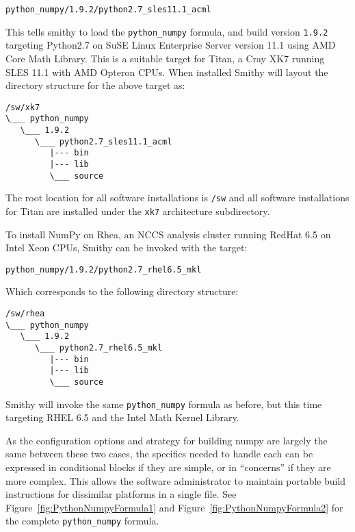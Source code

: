 \documentclass{acm_proc_article-sp}
\begin{document}
\begin{quoting}
\begin{verbatim}
python_numpy/1.9.2/python2.7_sles11.1_acml
\end{verbatim}
\end{quoting}

This tells smithy to load the \texttt{python\_numpy} formula, and build version
\texttt{1.9.2} targeting Python2.7 on SuSE Linux Enterprise Server version 11.1
using AMD Core Math Library. This is a suitable target for Titan, a Cray XK7
running SLES 11.1 with AMD Opteron CPUs. When installed Smithy will layout the
directory structure for the above target as:

\begin{quoting}
\begin{verbatim}
/sw/xk7
\___ python_numpy
   \___ 1.9.2
      \___ python2.7_sles11.1_acml
         |--- bin
         |--- lib
         \___ source
\end{verbatim}
\end{quoting}

The root location for all software installations is \texttt{/sw} and all
software installations for Titan are installed under the \texttt{xk7}
architecture subdirectory.

To install NumPy on Rhea, an NCCS analysis cluster running RedHat 6.5 on Intel
Xeon CPUs, Smithy can be invoked with the target:

\begin{quoting}
\begin{verbatim}
python_numpy/1.9.2/python2.7_rhel6.5_mkl
\end{verbatim}
\end{quoting}

Which corresponds to the following directory structure:

\begin{quoting}
\begin{verbatim}
/sw/rhea
\___ python_numpy
   \___ 1.9.2
      \___ python2.7_rhel6.5_mkl
         |--- bin
         |--- lib
         \___ source
\end{verbatim}
\end{quoting}

Smithy will invoke the same \texttt{python\_numpy} formula as before, but this
time targeting RHEL 6.5 and the Intel Math Kernel Library.

As the configuration options and strategy for building numpy are largely the
same between these two cases, the specifics needed to handle each can be
expressed in conditional blocks if they are simple, or in ``concerns'' if they
are more complex. This allows the software administrator to maintain portable
build instructions for dissimilar platforms in a single file. See
Figure~\ref{fig:PythonNumpyFormula1} and Figure~\ref{fig:PythonNumpyFormula2}
for the complete \texttt{python\_numpy} formula.
\end{document}
